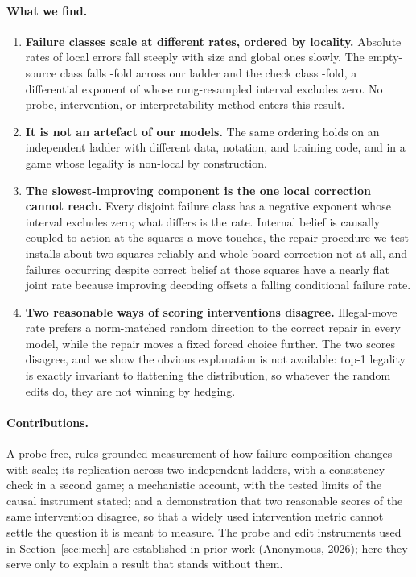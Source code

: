 \documentclass[11pt]{article}
\newcommand{\priorp}{(Anonymous, 2026)}
\newcommand{\priorp}{\citep{rathore2026coherent}}
\begin{document}
\paragraph{What we find.}
\begin{enumerate}[nosep]
\item \textbf{Failure classes scale at different rates, ordered by locality.}
Absolute rates of local errors fall steeply with size and global ones slowly. The
empty-source class falls -fold across our ladder and the check class
-fold, a differential exponent of  whose rung-resampled
interval excludes zero. No probe,
intervention, or interpretability method enters this result.
\item \textbf{It is not an artefact of our models.} The same ordering holds on an
independent ladder with different data, notation, and training code, and in a
game whose legality is non-local by construction.
\item \textbf{The slowest-improving component is the one local correction cannot
reach.} Every disjoint failure class has a negative exponent whose interval excludes zero;
what differs is the rate.
Internal belief is causally coupled to action at the squares a move touches, the
repair procedure we test installs about two squares reliably and whole-board
correction not at all, and failures occurring despite correct belief at those squares
have a nearly flat joint rate because improving decoding offsets a falling
conditional failure rate.
\item \textbf{Two reasonable ways of scoring interventions disagree.}
Illegal-move rate prefers a norm-matched random direction to the correct repair in
every model, while the repair moves a fixed forced choice further. The two scores
disagree, and we show the obvious explanation is not available: top-1 legality is
exactly invariant to flattening the distribution, so whatever the random edits do,
they are not winning by hedging.
\end{enumerate}

\paragraph{Contributions.}
A probe-free, rules-grounded measurement of how failure composition changes with
scale; its replication across two independent ladders, with a consistency check in a
second game; a mechanistic account,
with the tested limits of the causal instrument stated; and a demonstration
that two reasonable scores of the same intervention disagree, so that a widely used
intervention metric cannot settle the question it is
meant to measure. The probe and edit instruments used in Section~\ref{sec:mech}
are established in prior work \priorp; here they serve only to
explain a result that stands without them.
\end{document}
